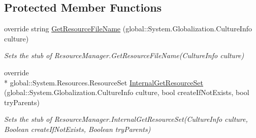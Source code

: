 \subsection*{Protected Member Functions}
\begin{DoxyCompactItemize}
\item 
override string \hyperlink{class_system_1_1_resources_1_1_fakes_1_1_stub_resource_manager_ac0af7a030e8f5ed714798c6d5ad57038}{Get\-Resource\-File\-Name} (global\-::\-System.\-Globalization.\-Culture\-Info culture)
\begin{DoxyCompactList}\small\item\em Sets the stub of Resource\-Manager.\-Get\-Resource\-File\-Name(\-Culture\-Info culture)\end{DoxyCompactList}\item 
override \\*
global\-::\-System.\-Resources.\-Resource\-Set \hyperlink{class_system_1_1_resources_1_1_fakes_1_1_stub_resource_manager_aa73c293e68c9f2302493ddf6ba977d7d}{Internal\-Get\-Resource\-Set} (global\-::\-System.\-Globalization.\-Culture\-Info culture, bool create\-If\-Not\-Exists, bool try\-Parents)
\begin{DoxyCompactList}\small\item\em Sets the stub of Resource\-Manager.\-Internal\-Get\-Resource\-Set(\-Culture\-Info culture, Boolean create\-If\-Not\-Exists, Boolean try\-Parents)\end{DoxyCompactList}\end{DoxyCompactItemize}
